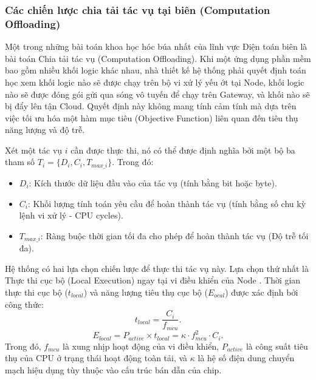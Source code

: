 \subsubsection{Các chiến lược chia tải tác vụ tại biên (Computation Offloading)}
Một trong những bài toán khoa học hóc búa nhất của lĩnh vực Điện toán biên là bài toán Chia tải tác vụ (Computation Offloading). Khi một ứng dụng phần mềm bao gồm nhiều khối logic khác nhau, nhà thiết kế hệ thống phải quyết định toán học xem khối logic nào sẽ được chạy trên bộ vi xử lý yếu ớt tại Node, khối logic nào sẽ được đóng gói gửi qua sóng vô tuyến để chạy trên Gateway, và khối nào sẽ bị đẩy lên tận Cloud. Quyết định này không mang tính cảm tính mà dựa trên việc tối ưu hóa một hàm mục tiêu (Objective Function) liên quan đến tiêu thụ năng lượng và độ trễ.

Xét một tác vụ $i$ cần được thực thi, nó có thể được định nghĩa bởi một bộ ba tham số $T_i = \{D_i, C_i, T_{max\_i}\}$. Trong đó:
\begin{itemize}
    \item $D_i$: Kích thước dữ liệu đầu vào của tác vụ (tính bằng bit hoặc byte).
    \item $C_i$: Khối lượng tính toán yêu cầu để hoàn thành tác vụ (tính bằng số chu kỳ lệnh vi xử lý - CPU cycles).
    \item $T_{max\_i}$: Ràng buộc thời gian tối đa cho phép để hoàn thành tác vụ (Độ trễ tối đa).
\end{itemize}
Hệ thống có hai lựa chọn chiến lược để thực thi tác vụ này. Lựa chọn thứ nhất là Thực thi cục bộ (Local Execution) ngay tại vi điều khiển của Node \cite{mao2017survey} . Thời gian thực thi cục bộ ($t_{local}$) và năng lượng tiêu thụ cục bộ ($E_{ocal}$) được xác định bởi công thức\cite{mach2017mobile}:
\begin{equation}
    {t_{local} = \frac{C_i}{f_{mcu}}}.
\end{equation}
\begin{equation}
    {E_{local} = P_{active} \times t_{local} = \kappa \cdot f_{mcu}^2 \cdot C_i}.
\end{equation}
Trong đó, $f_{mcu}$ là xung nhịp hoạt động của vi điều khiển, $P_{active}$ là công suất tiêu thụ của CPU ở trạng thái hoạt động toàn tải, và $\kappa$ là hệ số điện dung chuyển mạch hiệu dụng tùy thuộc vào cấu trúc bán dẫn của chip.


